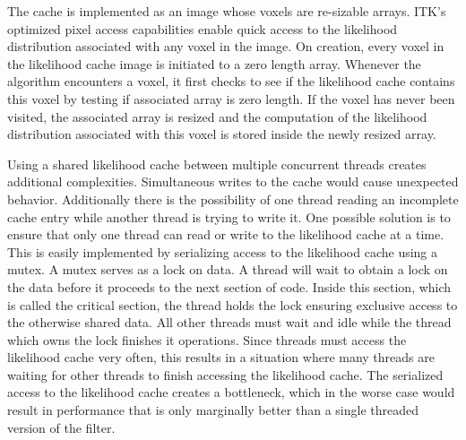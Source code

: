 \documentclass{InsightArticle}
\begin{document}
The cache is implemented as an image whose voxels are re-sizable arrays.  ITK's optimized pixel access capabilities enable quick access to the likelihood distribution associated with any voxel in the image.  On creation, every voxel in the likelihood cache image is initiated to a zero length array.  Whenever the algorithm encounters a voxel, it first checks to see if the likelihood cache contains this voxel by testing if associated array is zero length.  If the voxel has never been visited, the associated array is resized and the computation of the likelihood distribution associated with this voxel is stored inside the newly resized array.

Using a shared likelihood cache between multiple concurrent threads creates additional complexities.  Simultaneous writes to the cache would cause unexpected behavior.  Additionally there is the possibility of one thread reading an incomplete cache entry while another thread is trying to write it.  One possible solution is to ensure that only one thread can read or write to the likelihood cache at a time.  This is easily implemented by serializing access to the likelihood cache using a mutex.  A mutex serves as a lock on data.  A thread will wait to obtain a lock on the data before it proceeds to the next section of code.  Inside this section, which is called the critical section, the thread holds the lock ensuring exclusive access to the otherwise shared data.  All other threads must wait and idle while the thread which owns the lock finishes it operations.  Since threads must access the likelihood cache very often, this results in a situation where many threads are waiting for other threads to finish accessing the likelihood cache.  The serialized access to the likelihood cache creates a bottleneck, which in the worse case would result in performance that is only marginally better than a single threaded version of the filter.
\end{document}
